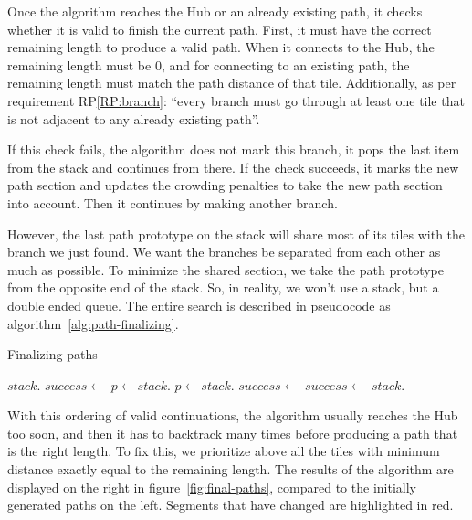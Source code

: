 Once the algorithm reaches the Hub or an already existing path, it checks whether it is valid to finish the current path.
First, it must have the correct remaining length to produce a valid path.
When it connects to the Hub, the remaining length must be 0, and for connecting to an existing path, the remaining length must match the path distance of that tile.
Additionally, as per requirement RP\ref{RP:branch}: \enquote{every branch must go through at least one tile that is not adjacent to any already existing path}.

If this check fails, the algorithm does not mark this branch, it pops the last item from the stack and continues from there.
If the check succeeds, it marks the new path section and updates the crowding penalties to take the new path section into account.
Then it continues by making another branch.

However, the last path prototype on the stack will share most of its tiles with the branch we just found.
We want the branches be separated from each other as much as possible.
To minimize the shared section, we take the path prototype from the opposite end of the stack.
So, in reality, we won't use a stack, but a double ended queue.
The entire search is described in pseudocode as algorithm~\ref{alg:path-finalizing}.

\begin{algorithm}[H]
    \caption{Finalizing paths}
    \label{alg:path-finalizing}
    \begin{algorithmic}[1]
        \State $stack$.
        \State $success \gets$ 
        \Statex
        \State $p \gets stack$.
        \Else
        \State $p \gets stack$.
        \EndIf
        \Statex
        \State $success \gets$ 
        \Else
        \State $success \gets$ 
        \State $stack$.
        \EndFor
        \EndIf
        \EndWhile
        \EndFor
        \Statex
    \end{algorithmic}
\end{algorithm}

With this ordering of valid continuations, the algorithm usually reaches the Hub too soon, and then it has to backtrack many times before producing a path that is the right length.
To fix this, we prioritize above all the tiles with minimum distance exactly equal to the remaining length.
The results of the algorithm are displayed on the right in figure~\ref{fig:final-paths}, compared to the initially generated paths on the left.
Segments that have changed are highlighted in red.

